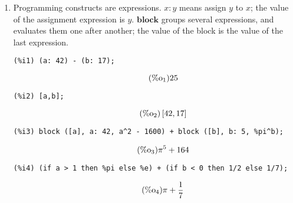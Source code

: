 \documentclass[12pt,leqno]{article}
\begin{document}
\begin{enumerate}
\begin{equation}
\begin{bmatrix}
\left[\pi, 17\right] & a d-b c\\
\begin{bmatrix}
1 & a\\
b & 7\\
\end{bmatrix}
 & e\\
\end{bmatrix}
\label{eq:doc-group1-code8-6-1}
\end{equation}
\begin{verbatim}
(%i7) M [2][1];
\end{verbatim}
\begin{equation}
\tag{$\mathop{\mathrm{\%o}}_{7}$}29
\label{eq:doc-group1-code8-7-1}
\end{equation}
\begin{verbatim}
(%i8) M2 [2][1];
\end{verbatim}
\begin{equation}
\tag{$\mathop{\mathrm{\%o}}_{8}$}\begin{bmatrix}
1 & a\\
b & 7\\
\end{bmatrix}
\label{eq:doc-group1-code8-8-1}
\end{equation}


\item Programming constructs are expressions.
$x : y$ means assign $y$ to $x$; the value of the assignment expression is $y$.
$\mathbf{block}$ groups several expressions, and evaluates them one after another;
the value of the block is the value of the last expression.
\begin{verbatim}
(%i1) (a: 42) - (b: 17);
\end{verbatim}
\begin{equation}
\tag{$\mathop{\mathrm{\%o}}_{1}$}25
\label{eq:doc-group1-code9-1-1}
\end{equation}
\begin{verbatim}
(%i2) [a,b];
\end{verbatim}
\begin{equation}
\tag{$\mathop{\mathrm{\%o}}_{2}$}\left[42, 17\right]
\label{eq:doc-group1-code9-2-1}
\end{equation}
\begin{verbatim}
(%i3) block ([a], a: 42, a^2 - 1600) + block ([b], b: 5, %pi^b);
\end{verbatim}
\begin{equation}
\tag{$\mathop{\mathrm{\%o}}_{3}$}{\pi}^{5}+164
\label{eq:doc-group1-code9-3-1}
\end{equation}
\begin{verbatim}
(%i4) (if a > 1 then %pi else %e) + (if b < 0 then 1/2 else 1/7);
\end{verbatim}
\begin{equation}
\tag{$\mathop{\mathrm{\%o}}_{4}$}\pi+\frac{1}{7}
\label{eq:doc-group1-code9-4-1}
\end{equation}



\end{enumerate}
\end{document}
